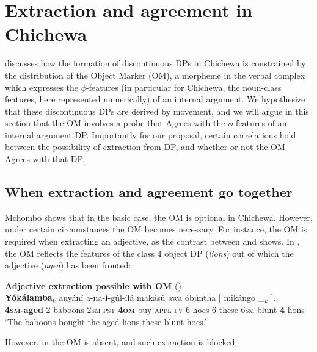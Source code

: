 \documentclass[output=paper,colorlinks,citecolor=brown]{langscibook}
\begin{document}
\section{Extraction and agreement in Chichewa}\label{sec:branan:3}

\citet{Mchombo2004, Mchombo2006} discusses how the formation of discontinuous DPs in Chichewa is constrained by the distribution of the Object Marker (OM), a morpheme in the verbal complex which expresses the $\phi$-features (in particular for Chichewa, the noun-class features, here represented numerically) of an internal argument. We hypothesize that these discontinuous DPs are derived by movement, and we will argue in this section that the OM involves a probe that Agrees with the $\phi$-features of an internal argument DP. Importantly for our proposal, certain correlations hold between the possibility of extraction from DP, and whether or not the OM Agrees with that DP.

\subsection{When extraction and agreement go together}\label{sec:branan:3.1}

Mchombo shows that in the basic case, the OM is optional in Chichewa. However, under certain circumstances the OM becomes necessary. For instance, the OM is required when extracting an adjective, as the contrast between  and  shows. In , the OM reflects the features of the class 4 object DP (\textit{lions}) out of which the adjective (\textit{aged}) has been fronted:

\ea%
    \label{ex:branan:5}
    \textbf{Adjective extraction possible with OM} \hfill{(\citealt[ex. 21b]{Mchombo2004})}\\
    \gll    \textbf{Y\'{o}k\'{a}lamba}$_{k}$ any\'{a}n\'{i} a-na-\textbf{\'{i}}-g\'{u}l-\'{i}l\'{a} mak\'{a}s\'{u} awa \'{o}b\'{u}ntha [ mik\'{a}ngo  \_$_{k}$ ].   \\
             \textbf{4\textsc{sm}-aged} 2-baboons 2\textsc{sm-pst}-\underline{\textbf{4\textsc{om}}}-buy-\textsc{appl-fv} 6-hoes 6-these 6\textsc{sm}-blunt {}  \underline{\textbf{4}}-lions \\
    \glt    `The baboons  bought the aged lions these blunt hoes.'
\z

However, in  the OM is absent, and such extraction is blocked:
\end{document}
